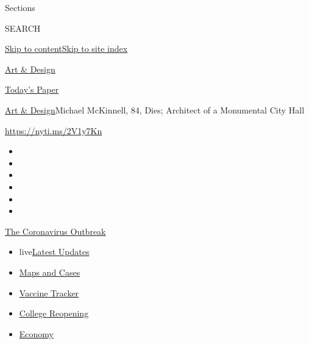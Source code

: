 Sections

SEARCH

\protect\hyperlink{site-content}{Skip to
content}\protect\hyperlink{site-index}{Skip to site index}

\href{https://www.nytimes.com/section/arts/design}{Art \& Design}

\href{https://myaccount.nytimes.com/auth/login?response_type=cookie\&client_id=vi}{}

\href{https://www.nytimes.com/section/todayspaper}{Today's Paper}

\href{/section/arts/design}{Art \& Design}\textbar{}Michael McKinnell,
84, Dies; Architect of a Monumental City Hall

\url{https://nyti.ms/2V1y7Kn}

\begin{itemize}
\item
\item
\item
\item
\item
\item
\end{itemize}

\href{https://www.nytimes.com/news-event/coronavirus?action=click\&pgtype=Article\&state=default\&region=TOP_BANNER\&context=storylines_menu}{The
Coronavirus Outbreak}

\begin{itemize}
\tightlist
\item
  live\href{https://www.nytimes.com/2020/08/03/world/coronavirus-covid-19.html?action=click\&pgtype=Article\&state=default\&region=TOP_BANNER\&context=storylines_menu}{Latest
  Updates}
\item
  \href{https://www.nytimes.com/interactive/2020/us/coronavirus-us-cases.html?action=click\&pgtype=Article\&state=default\&region=TOP_BANNER\&context=storylines_menu}{Maps
  and Cases}
\item
  \href{https://www.nytimes.com/interactive/2020/science/coronavirus-vaccine-tracker.html?action=click\&pgtype=Article\&state=default\&region=TOP_BANNER\&context=storylines_menu}{Vaccine
  Tracker}
\item
  \href{https://www.nytimes.com/2020/08/02/us/covid-college-reopening.html?action=click\&pgtype=Article\&state=default\&region=TOP_BANNER\&context=storylines_menu}{College
  Reopening}
\item
  \href{https://www.nytimes.com/live/2020/08/03/business/stock-market-today-coronavirus?action=click\&pgtype=Article\&state=default\&region=TOP_BANNER\&context=storylines_menu}{Economy}
\end{itemize}

